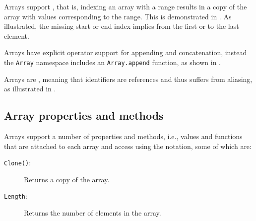 Arrays support , that is, indexing an array with a range results in a copy of the array with values corresponding to the range. This is demonstrated in .
%
%
As illustrated, the missing start or end index implies from the first or to the last element.

Arrays have explicit operator support for appending and concatenation, instead the \lstinline{Array} namespace includes an \lstinline{Array.append} function, as shown in .
%
%

Arrays are , meaning that identifiers are references and thus suffers from aliasing, as illustrated in .
%
%

\subsection{Array properties and methods}
\label{sec:arrayMethods}
Arrays support a number of properties and methods, i.e., values and functions that are attached to each array and access using the  notation, some of which are:
\begin{description}
\item[\texttt{Clone()}:] Returns a copy of the array.
\item[\texttt{Length}:] Returns the number of elements in the array.
\end{description}

